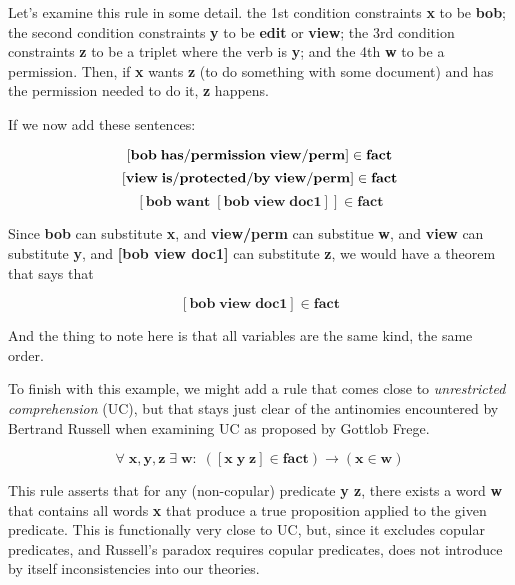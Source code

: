 \documentclass{IOS-Book-Article}     %
\begin{document}
Let's examine this rule in some detail.
the 1st condition constraints \textbf{x} to be \textbf{bob};
the second condition constraints \textbf{y} to be \textbf{edit} or \textbf{view};
the  3rd condition constraints \textbf{z} to be a triplet where the verb is \textbf{y};
and the 4th \textbf{w} to be a  permission.
Then, if \textbf{x} wants \textbf{z} (to do something with some document)
and has the permission needed to do it,
\textbf{z} happens.

If we now  add these sentences:

\begin{equation}
  \mathbf{\left[bob\; has\-/permission\; view\-/perm\right] \in  fact}
\end{equation}
\begin{equation}
  \mathbf{\left[view\; is\-/protected\-/by\; view\-/perm\right] \in fact}
\end{equation}
\begin{equation}
  \mathbf{\left[bob\; want\; \left[bob\; view\; doc1\right]\right] \in fact}
\end{equation}

Since \textbf{bob} can substitute \textbf{x},
and \textbf{view\-/perm} can substitue \textbf{w},
and \textbf{view} can substitute \textbf{y},
and \textbf{[bob view doc1]} can substitute \textbf{z},
we would have a  theorem that says that

\begin{equation}
  \mathbf{\left[bob\; view\; doc1\right] \in fact}
\end{equation}

And the thing to note here is that all variables are
the same  kind, the same order.

To finish with this example, we might add a rule that comes close to
\textit{unrestricted comprehension} (UC), but that stays just clear of
the antinomies encountered by  Bertrand Russell when examining UC
as proposed by Gottlob Frege.

\begin{equation}
  \forall\;\mathbf{x}\mathrm{,}\mathbf{y}\mathrm{,}\mathbf{z}\;\exists\;\mathbf{w}\mathrm{:} \;\mathbf{\left(\left[x\; y\; z\right] \in fact\right)} \rightarrow \mathbf{\left(x \in w\right)}
\end{equation}

This rule asserts that for any (non-copular) predicate \textbf{y z},
there exists a word \textbf{w} that contains all words \textbf{x} that
produce a true proposition applied to the given predicate. This is
functionally very close to UC, but, since it excludes copular
predicates, and Russell's paradox requires copular predicates,
does not introduce by itself inconsistencies into our theories.
\end{document}
